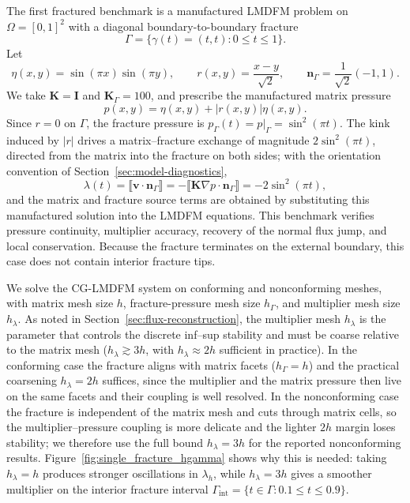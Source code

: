 \documentclass[a4paper,fleqn]{cas-sc}
\newcommand{\jump}[1]{\lBrack #1 \rBrack}
\newcommand{\Kmat}{\mathbf{K}}
\newcommand{\vflux}{\mathbf{v}}
\begin{document}
The first fractured benchmark is a manufactured LMDFM problem on
\(\Omega=[0,1]^2\) with a diagonal boundary-to-boundary fracture
\[
  \Gamma=\{\gamma(t)=(t,t):0\le t\le 1\}.
\]
Let
\[
\eta(x,y)=\sin(\pi x)\sin(\pi y),\qquad
r(x,y)=\frac{x-y}{\sqrt2},\qquad
\mathbf{n}_\Gamma=\frac{1}{\sqrt2}(-1,1).
\]
We take \(\Kmat=\mathbf{I}\) and \(\Kmat_\Gamma=100\), and prescribe the
manufactured matrix pressure
\[
  p(x,y)=\eta(x,y)+|r(x,y)|\eta(x,y).
\]
Since \(r=0\) on \(\Gamma\), the fracture pressure is
\(p_\Gamma(t)=p|_\Gamma=\sin^2(\pi t)\). The kink induced by \(|r|\) drives a
matrix--fracture exchange of magnitude \(2\sin^2(\pi t)\), directed from the
matrix into the fracture on both sides; with the orientation convention of
Section~\ref{sec:model-diagnostics},
\[
  \lambda(t)=\jump{\vflux\cdot\mathbf{n}_\Gamma}
  =-\jump{\Kmat\nabla p\cdot\mathbf{n}_\Gamma}
  =-2\sin^2(\pi t),
\]
and the matrix and fracture source terms are obtained by substituting this
manufactured solution into the LMDFM equations. This benchmark verifies pressure
continuity, multiplier accuracy, recovery of the normal flux jump, and local
conservation. Because the fracture terminates on the external boundary, this
case does not contain interior fracture tips.

We solve the CG-LMDFM system on conforming and nonconforming meshes, with matrix
mesh size \(h\), fracture-pressure mesh size \(h_\Gamma\), and multiplier mesh
size \(h_\lambda\). As noted in Section~\ref{sec:flux-reconstruction}, the
multiplier mesh \(h_\lambda\) is the parameter that controls the discrete
inf--sup stability \citep{Koeppel2019} and must be coarse relative to the matrix
mesh (\(h_\lambda\gtrsim 3h\), with \(h_\lambda\approx 2h\) sufficient in
practice). In the conforming case the fracture aligns with matrix facets
(\(h_\Gamma=h\)) and the practical coarsening \(h_\lambda=2h\) suffices, since
the multiplier and the matrix pressure then live on the same facets and their
coupling is well resolved. In the nonconforming case the
fracture is independent of the matrix mesh and cuts through matrix cells, so the
multiplier--pressure coupling is more delicate and the lighter \(2h\) margin
loses stability; we therefore use the full bound \(h_\lambda=3h\) for the
reported nonconforming results. Figure~\ref{fig:single_fracture_hgamma} shows why
this is needed: taking \(h_\lambda=h\) produces stronger oscillations in
\(\lambda_h\), while \(h_\lambda=3h\) gives a smoother multiplier on the interior
fracture interval \(\Gamma_{\mathrm{int}}=\{t\in\Gamma:0.1\le t\le 0.9\}\).
\end{document}

